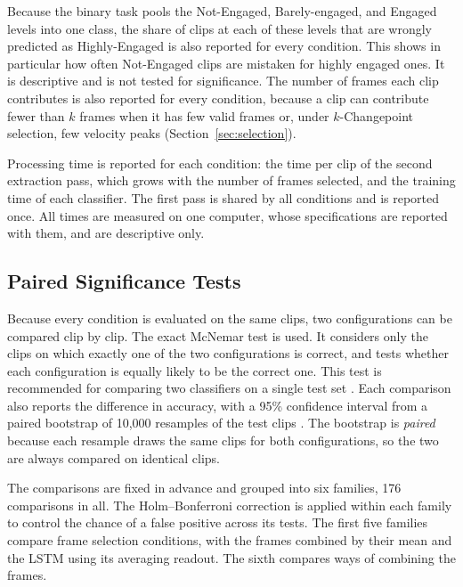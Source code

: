Because the binary task pools the Not-Engaged, Barely-engaged, and Engaged levels into one class, the share of clips at each of these levels that are wrongly predicted as Highly-Engaged is also reported for every condition. This shows in particular how often Not-Engaged clips are mistaken for highly engaged ones. It is descriptive and is not tested for significance. The number of frames each clip contributes is also reported for every condition, because a clip can contribute fewer than $k$ frames when it has few valid frames or, under $k$-Changepoint selection, few velocity peaks (Section~\ref{sec:selection}).

Processing time is reported for each condition: the time per clip of the second extraction pass, which grows with the number of frames selected, and the training time of each classifier. The first pass is shared by all conditions and is reported once. All times are measured on one computer, whose specifications are reported with them, and are descriptive only.

\subsection{Paired Significance Tests}

Because every condition is evaluated on the same clips, two configurations can be compared clip by clip. The exact McNemar test \cite{mcnemar1947} is used. It considers only the clips on which exactly one of the two configurations is correct, and tests whether each configuration is equally likely to be the correct one. This test is recommended for comparing two classifiers on a single test set \cite{dietterich1998}. Each comparison also reports the difference in accuracy, with a 95\% confidence interval from a paired bootstrap of 10,000 resamples of the test clips \cite{efron1993}. The bootstrap is \emph{paired} because each resample draws the same clips for both configurations, so the two are always compared on identical clips.

The comparisons are fixed in advance and grouped into six families, 176 comparisons in all. The Holm--Bonferroni correction \cite{holm1979} is applied within each family to control the chance of a false positive across its tests. The first five families compare frame selection conditions, with the frames combined by their mean and the LSTM using its averaging readout. The sixth compares ways of combining the frames.

